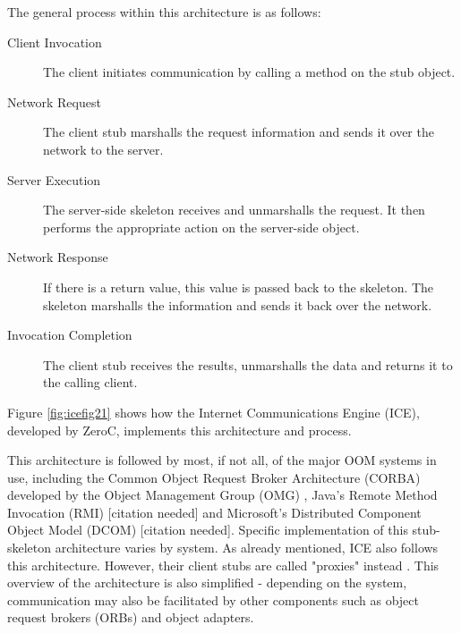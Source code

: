 \documentclass{acm_proc_article-sp}
\begin{document}
The general process within this architecture is as follows:
\begin{description}
\item[Client Invocation] The client initiates communication by calling a method on the stub object.
\item[Network Request] The client stub marshalls the request information and sends it over the network to the server.
\item[Server Execution] The server-side skeleton receives and unmarshalls the request.  It then performs the appropriate action on the server-side object.
\item[Network Response] If there is a return value, this value is passed back to the skeleton.  The skeleton marshalls the information and sends it back over the network.
\item[Invocation Completion] The client stub receives the results, unmarshalls the data and returns it to the calling client.
\end{description}

Figure \ref{fig:icefig21} shows how the Internet Communications Engine (ICE), developed by ZeroC, implements this architecture and process.



This architecture is followed by most, if not all, of the major OOM systems in use, including the Common Object Request Broker Architecture (CORBA) developed by the Object Management Group (OMG) \cite{Emmerich:2007p8368}, Java's Remote Method Invocation (RMI) [citation needed] and Microsoft's Distributed Component Object Model (DCOM) [citation needed].  Specific implementation of this stub-skeleton architecture varies by system.  As already mentioned, ICE also follows this architecture.  However, their client stubs are called "proxies" instead \cite{icemanual}.  This overview of the architecture is also simplified - depending on the system, communication may also be facilitated by other components such as object request brokers (ORBs) and object adapters.
\end{document}
